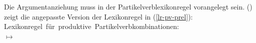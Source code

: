 Die Argumentanziehung muss in der Partikelverblexikonregel vorangelegt sein.
() zeigt die angepasste Version der Lexikonregel in (\ref{lr-pv-prel}):
\eas
\label{lr-pv}%
\mbox{Lexikonregel für produktive Partikelverbkombinationen:}\\
\onems[stem]{
           synsem \ibox{1} \onems{ loc$|$cat \ms{ head & verb \\ 
                                                  arg-st & \ibox{2}\\
}
                                 } \\
         }  $\mapsto$ \\
\hfill{}%
%
\zs

